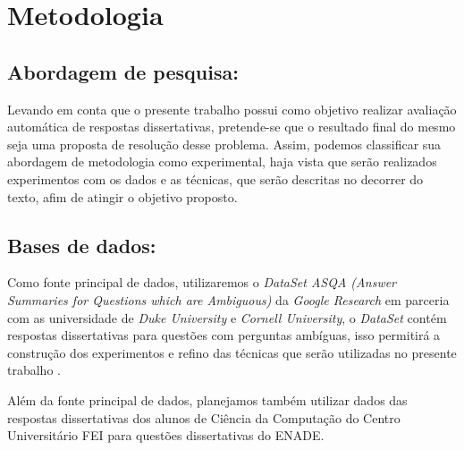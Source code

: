 \chapter{Metodologia}

\section{Abordagem de pesquisa:}
Levando em conta que o presente trabalho possui como objetivo realizar avaliação automática de respostas dissertativas, pretende-se que o resultado final do mesmo seja uma proposta de resolução desse problema. Assim, podemos classificar sua abordagem de metodologia como experimental, haja vista que serão realizados experimentos com os dados e as técnicas, que serão descritas no decorrer do texto, afim de atingir o objetivo proposto.



\section{Bases de dados:}
Como fonte principal de dados, utilizaremos o \textit{DataSet ASQA (Answer Summaries for Questions which are Ambiguous)} da \textit{Google Research} em parceria com as universidade de \textit{Duke University} e \textit{Cornell University}, o \textit{DataSet} contém respostas dissertativas para questões com perguntas ambíguas, isso permitirá a construção dos experimentos e refino das técnicas que serão utilizadas no presente trabalho \cite{dataSetGoogleASQA}.


Além da fonte principal de dados, planejamos também utilizar dados das respostas dissertativas dos alunos de Ciência da Computação do Centro Universitário FEI para questões dissertativas do ENADE.

